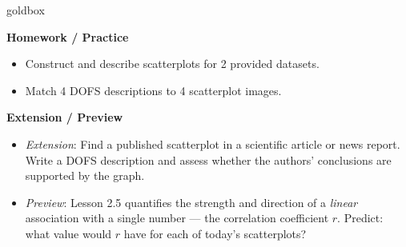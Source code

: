 \documentclass[10pt]{article}
\begin{document}
\begin{skillbox}{goldbox}
\begin{minipage}[t]{0.48\linewidth}
    \textbf{Homework / Practice}
    \begin{itemize}
        \item Construct and describe scatterplots for 2 provided datasets.
        \item Match 4 DOFS descriptions to 4 scatterplot images.
    \end{itemize}
\end{minipage}
\hfill
\begin{minipage}[t]{0.48\linewidth}
    \textbf{Extension / Preview}
    \begin{itemize}
        \item \textit{Extension}: Find a published scatterplot in a scientific article or news report.
              Write a DOFS description and assess whether the authors' conclusions are supported by the graph.
        \item \textit{Preview}: Lesson 2.5 quantifies the strength and direction of a \textit{linear}
              association with a single number --- the correlation coefficient $r$. Predict: what value
              would $r$ have for each of today's scatterplots?
    \end{itemize}
\end{minipage}
\end{skillbox}
\end{document}
